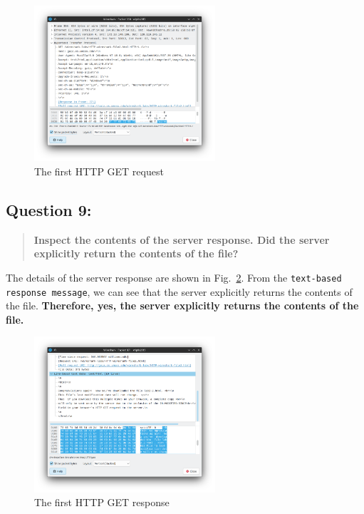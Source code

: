 \documentclass{cshwk}
\begin{document}
\begin{figure}[htbp]
    \centering
    \includegraphics[width=0.6\textwidth]{lab2-5.png}
    \caption{The first HTTP GET request}
    \label{fig:http-conditional-get-1}
\end{figure}

\subsection*{Question 9:}
\begin{quote}
    \textbf{Inspect the contents of the server response. Did the server explicitly return the contents of the file?}
\end{quote}

The details of the server response are shown in Fig.~\ref{fig:http-conditional-get-1-response}. From the \texttt{text-based response message}, we can see that the server explicitly returns the contents of the file. \textbf{Therefore, yes, the server explicitly returns the contents of the file.}


\begin{figure}[htbp]
    \centering
    \includegraphics[width=0.6\textwidth]{lab2-6.png}
    \caption{The first HTTP GET response}
    \label{fig:http-conditional-get-1-response}
\end{figure}
\end{document}
